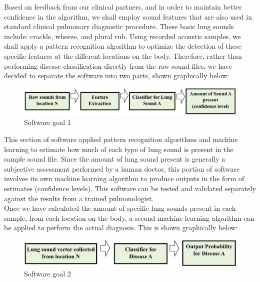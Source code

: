 \documentclass{article}
\begin{document}
 Based on feedback from our clinical partners, and in order to maintain better confidence in the algorithm, we shall employ sound features that are also used in standard clinical pulmonary diagnostic procedure. These basic lung sounds include: crackle, wheeze, and plural rub. Using recorded acoustic samples, we shall apply a pattern recognition algorithm to optimize the detection of these specific features at the different locations on the body. Therefore, rather than performing disease classification directly from the raw sound files, we have decided to separate the software into two parts, shown graphically below: \\
 
 \begin{figure}[H]
 \minipage{\textwidth}
 	\includegraphics[width=\linewidth]{images/SoftwareGoal1.png}
 	\caption{Software goal 1}
 \endminipage\hfill
 \end{figure}
 
 This section of software applied pattern recognition algorithms and machine learning to estimate how much of each type of lung sound is present in the sample sound file.  Since the amount of lung sound present is generally a subjective assessment performed by a human doctor, this portion of software involves its own machine learning algorithm to produce outputs in the form of estimates (confidence levels).  This software can be tested and validated separately against the results from a trained pulmonologist.\\
 
 Once we have calculated the amount of specific lung sounds present in each sample, from each location on the body, a second machine learning algorithm can be applied to perform the actual diagnosis.  This is shown graphically below:\\
 
  \begin{figure}[H]
  \minipage{\textwidth}
  	\includegraphics[width=\linewidth]{images/SoftwareGoal2.png}
  	\caption{Software goal 2}
  \endminipage\hfill
  \end{figure}
\end{document}
